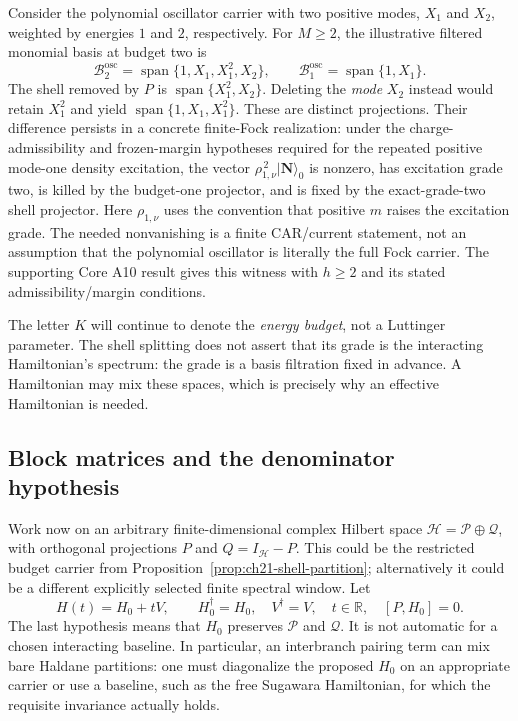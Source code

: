 \begin{example}
\label{ex:ch21-shell-versus-mode}
Consider the polynomial oscillator carrier with two positive modes,
$X_1$ and $X_2$, weighted by energies $1$ and $2$, respectively.  For
$M\geq2$, the illustrative filtered monomial basis at budget two is
\begin{equation}
 \mathcal B_2^{\mathrm{osc}}
  =\operatorname{span}\{1,X_1,X_1^2,X_2\},\qquad
 \mathcal B_1^{\mathrm{osc}}=\operatorname{span}\{1,X_1\}.
\label{eq:ch21-osc-shell-example}
\end{equation}
The shell removed by $P$ is
$\operatorname{span}\{X_1^2,X_2\}$.  Deleting the \emph{mode} $X_2$
instead would retain $X_1^2$ and yield
$\operatorname{span}\{1,X_1,X_1^2\}$.  These are distinct projections.
Their difference persists in a concrete finite-Fock realization: under
the charge-admissibility and frozen-margin hypotheses required for the
repeated positive mode-one density excitation, the vector
$\rho_{1,\nu}^{\,2}\lvert\boldsymbol N\rangle_0$ is nonzero, has
excitation grade two, is killed by the budget-one projector, and is
fixed by the exact-grade-two shell projector.  Here $\rho_{1,\nu}$
uses the convention that positive $m$ raises the excitation grade.
The needed nonvanishing is a finite CAR/current statement, not an
assumption that the polynomial oscillator is literally the full Fock
carrier.  The supporting Core A10 result gives this witness with
$h\geq2$ and its stated admissibility/margin conditions.
\end{example}

The letter $K$ will continue to denote the \emph{energy budget}, not a
Luttinger parameter.  The shell splitting does not assert that its
grade is the interacting Hamiltonian's spectrum: the grade is a basis
filtration fixed in advance.  A Hamiltonian may mix these spaces, which
is precisely why an effective Hamiltonian is needed.

\subsection{Block matrices and the denominator hypothesis}
\label{subsec:ch21-block-setup}

Work now on an arbitrary finite-dimensional complex Hilbert space
$\mathcal H=\mathcal P\oplus\mathcal Q$, with orthogonal projections
$P$ and $Q=I_{\mathcal H}-P$.  This could be the restricted budget
carrier from Proposition~\ref{prop:ch21-shell-partition}; alternatively it
could be a different explicitly selected finite spectral window.  Let
\begin{equation}
H(t)=H_0+tV,\qquad H_0^\dagger=H_0,\quad V^\dagger=V,
\quad t\in\mathbb R,\quad [P,H_0]=0.
\label{eq:ch21-H-perturbation}
\end{equation}
The last hypothesis means that $H_0$ preserves $\mathcal P$ and
$\mathcal Q$.  It is not automatic for a chosen interacting baseline.
In particular, an interbranch pairing term can mix bare Haldane
partitions: one must diagonalize the proposed $H_0$ on an appropriate
carrier or use a baseline, such as the free Sugawara Hamiltonian, for
which the requisite invariance actually holds.

